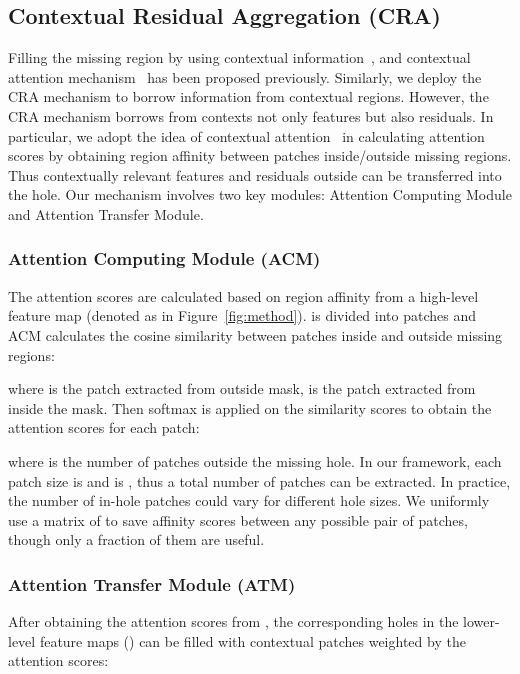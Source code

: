 \documentclass[oribibl]{llncs}  \usepackage[width=122mm,left=12mm,paperwidth=146mm,height=193mm,top=12mm,paperheight=217mm]{geometry}
\begin{document}
\subsection{Contextual Residual Aggregation (CRA)}
Filling the missing region by using contextual information~\cite{song2018contextual,yan2018shift,yu2015multi}, and contextual attention mechanism~\cite{yu2018generative} has been proposed previously. Similarly, we deploy the CRA mechanism to borrow information from contextual regions. However, the CRA mechanism borrows from contexts not only features but also residuals. In particular, we adopt the idea of contextual attention~\cite{yu2018generative} in calculating attention scores by obtaining region affinity between patches inside/outside missing regions. Thus contextually relevant features and residuals outside can be transferred into the hole. Our mechanism involves two key modules: Attention Computing Module and Attention Transfer Module.

\subsubsection{Attention Computing Module (ACM)}
\label{sect:acm}
The attention scores are calculated based on region affinity from a high-level feature map (denoted as  in Figure~\ref{fig:method}).   is divided into patches and ACM calculates the cosine similarity between patches inside and outside missing regions:



\noindent where  is the  patch extracted from  outside mask,  is the  patch extracted from  inside the mask. Then softmax is applied on the similarity scores to obtain the attention scores for each patch:



\noindent where  is the number of patches outside the missing hole. In our framework, each patch size is  and  is , thus a total number of  patches can be extracted. In practice, the number of in-hole patches could vary for different hole sizes. We uniformly use a matrix of  to save affinity scores between any possible pair of patches, though only a fraction of them are useful. 


\subsubsection{Attention Transfer Module (ATM)}\label{sect:atm}
After obtaining the attention scores from , the corresponding holes in the lower-level feature maps () can be filled with contextual patches weighted by the attention scores:
\end{document}
